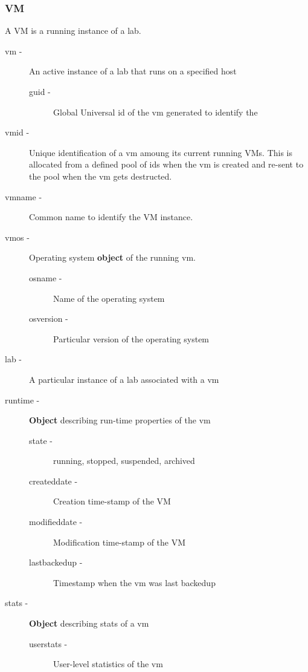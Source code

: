 \documentclass[11pt]{article}
\begin{document}
\subsubsection{VM}
\label{sec-1.3.6}


    A VM is a running instance of a lab.

\begin{description}
\item [vm -] An active instance of a lab that runs on a specified host

\begin{description}
\item [guid -] Global Universal id of the vm generated to identify the
\end{description}

\item [vmid -] Unique identification of a vm amoung its current running
      VMs. This is allocated from a defined pool of ids when the vm is
      created and re-sent to the pool when the vm gets destructed.
\item [vmname -] Common name to identify the VM instance.
\item [vmos -] Operating system \textbf{object} of the running vm.

\begin{description}
\item [osname -] Name of the operating system
\item [osversion -] Particular version of the operating system
\end{description}

\item [lab -] A particular instance of a lab associated with a vm
\item [runtime -] \textbf{Object} describing run-time properties of the vm

\begin{description}
\item [state -]  running, stopped, suspended, archived
\item [createddate -] Creation time-stamp of the VM
\item [modifieddate -] Modification time-stamp of the VM
\item [lastbackedup -] Timestamp when the vm was last backedup
\end{description}

\item [stats -] \textbf{Object} describing stats of a vm

\begin{description}
\item [userstats -] User-level statistics of the vm


\end{description}
\end{description}
\end{document}

